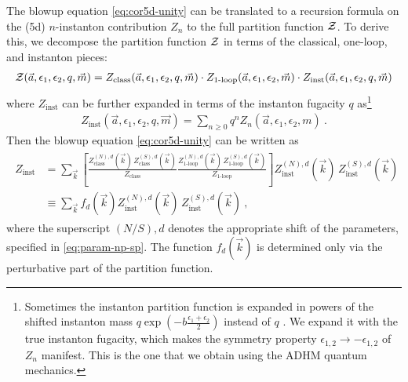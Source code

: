 \documentclass[letterpaper, 11pt]{article}
\def\CZ{{\cal Z}}
\def\e{\epsilon}
\begin{document}
The blowup equation \eqref{eq:cor5d-unity} can be translated to a recursion formula on the (5d) $n$-instanton contribution $Z_n$ to the full partition function $\CZ$.
To derive this, we decompose the partition function $\CZ$ in terms of the classical, one-loop, and instanton pieces: 
\begin{align}
  \CZ(\vec{a}, \e_1, \e_2, q, \vec{m}) = Z_{\textrm{class}}(\vec{a}, \e_1, \e_2, q, \vec{m}) \cdot  Z_{\textrm{1-loop}} (\vec{a}, \e_1, \e_2, \vec{m}) \cdot Z_{\textrm{inst}}(\vec{a}, \e_1, \e_2, q, \vec{m})
 \end{align}
where $Z_\text{inst}$ can be further expanded in terms of the instanton fugacity $q$ as\footnote{Sometimes the instanton partition function is expanded in powers of the shifted instanton mass $q \exp (-b \frac{\e_1+\e_2}{2})$ instead of $q$ \cite{Nakajima:2005fg, Gottsche:2006bm, Keller:2012da}. We expand it with the true instanton fugacity, which makes the symmetry property $\e_{1, 2} \to - \e_{1, 2}$ of $Z_n$ manifest. This is the one that we obtain using the ADHM quantum mechanics.}
\begin{align}
 Z_{\textrm{inst}} (\vec{a}, \e_1, \e_2, q, \vec{m}) = \sum_{n \ge 0} q^n Z_n (\vec{a}, \e_1, \e_2, m) \ . 
\end{align}
Then the blowup equation \eqref{eq:cor5d-unity} can be written as
\begin{align}
  \label{eq:recur-inst}
  \begin{split}
 Z_{\textrm{inst}} &= \sum_{\vec{k}} \left[ \frac{Z^{(N), d}_{\textrm{class}}(\vec{k}) \, Z^{(S), d}_{\textrm{class}}(\vec{k})}{Z_{\textrm{class}}}  \frac{Z^{(N), d}_{\textrm{1-loop}}(\vec{k})\, Z^{(S), d}_{\textrm{1-loop}}(\vec{k})}{Z_{\textrm{1-loop}}} \right] Z^{(N), d}_{\textrm{inst}}(\vec{k})\, Z^{(S), d}_{\textrm{inst}}(\vec{k}) \\
  &\equiv  \sum_{\vec{k}} f_d(\vec{k}) Z^{(N), d}_{\textrm{inst}}(\vec{k})\, Z^{(S), d}_{\textrm{inst}}(\vec{k}) \ , 
  \end{split}
\end{align}
where the superscript $(N/S),d$ denotes the appropriate shift of the parameters, specified in \eqref{eq:param-np-sp}. The function $f_d(\vec{k})$ is determined only via the perturbative part of the partition function. 
\end{document}
